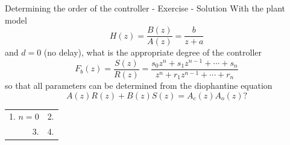 \documentclass[presentation,aspectratio=169]{beamer}
\begin{document}
\begin{frame}[label={sec:org694cb05}]{Determining the order of the controller - Exercise - Solution}
With the plant model \[H(z) = \frac{B(z)}{A(z)} = \frac{b}{z + a}\] and \(d=0\) (no delay), what is the appropriate degree of the controller \[F_b(z) = \frac{S(z)}{R(z)} = \frac{s_0z^n + s_1z^{n-1} + \cdots + s_n}{z^n + r_1 z^{n-1} + \cdots + r_n}\]
so that all parameters can be determined from the diophantine equation
\[ A(z)R(z) + B(z)S(z) = A_c(z)A_o(z)?\]
\begin{center}
\begin{tabular}{rr}
1. \(n = 0\) & 2.\\
3. & 4.\\
\end{tabular}
\end{center}
\end{frame}
\end{document}
